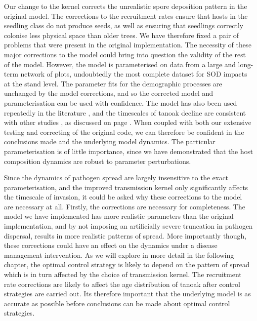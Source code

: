 Our change to the kernel corrects the unrealistic spore deposition pattern in the original model. The corrections to the recruitment rates ensure that hosts in the seedling class do not produce seeds, as well as ensuring that seedlings correctly colonise less physical space than older trees. We have therefore fixed a pair of problems that were present in the original implementation. The necessity of these major corrections to the model could bring into question the validity of the rest of the model. However, the model is parameterised on data from a large and long-term network of plots, undoubtedly the most complete dataset for SOD impacts at the stand level. The parameter fits for the demographic processes are unchanged by the model corrections, and so the corrected model and parameterisation can be used with confidence. The model has also been used repeatedly in the literature \citep[e.g.][]{cobb_resiliency_2017, valachovic_forest_2017, cobb_promise_2019}, and the timescales of tanoak decline are consistent with other studies \citep{mcpherson_responses_2010, davidson_transmission_2005}, as discussed on page \pageref{sec:ch5:reparameterisation}. When coupled with both our extensive testing and correcting of the original code, we can therefore be confident in the conclusions made and the underlying model dynamics. The particular parameterisation is of little importance, since we have demonstrated that the host composition dynamics are robust to parameter perturbations.

Since the dynamics of pathogen spread are largely insensitive to the exact parameterisation, and the improved transmission kernel only significantly affects the timescale of invasion, it could be asked why these corrections to the model are necessary at all. Firstly, the corrections are necessary for completeness. The model we have implemented has more realistic parameters than the original implementation, and by not imposing an artificially severe truncation in pathogen dispersal, results in more realistic patterns of spread. More importantly though, these corrections could have an effect on the dynamics under a disease management intervention. As we will explore in more detail in the following chapter, the optimal control strategy is likely to depend on the pattern of spread \citep{hyatt-twynam_risk-based_2017} which is in turn affected by the choice of transmission kernel. The recruitment rate corrections are likely to affect the age distribution of tanoak after control strategies are carried out. Its therefore important that the underlying model is as accurate as possible before conclusions can be made about optimal control strategies.

